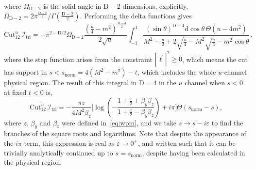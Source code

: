 \documentclass[12pt]{article}
\numberwithin{figure}{section}
\def \be {\begin{equation}}
\def \ee {\end{equation}}
\def \D {\mathrm{D}}
\def \d {\mathrm{d}}
\def \eps {\varepsilon}
\def \geq {\geqslant}
\def \I {\mathcal{I}}
\def \triangle {\mathrm{tri}}
\def \normal {\mathrm{norm}}
\def \Cut {\mathrm{Cut}}
\begin{document}
    where $\Omega_{\D-2}$ is the solid angle in $\D{-}2$ dimensions, explicitly, 
    $\Omega_{\D-2} = 2 \pi^{\frac{\D-2}{2}} /\Gamma \left(\frac{\D-2}{2}\right)$.
    Performing the delta functions gives
    \be
        \Cut_{12}^u\, \I_{\triangle} =
        - \pi^{2-\D/2} \Omega_{\D-2} \frac{\left(\frac{u}{4} - m^2 \right)^{\frac{\D-3}{2}}}{2\sqrt{u}} \int_{-1}^1 \frac{\left(\sin \theta\right)^{\D-4} \d \cos \theta\, \Theta(u-4m^2)}{M^2-\frac{u}{2} + 2 \sqrt{\frac{u}{4}-M^2}\sqrt{\frac{u}{4}-m^2} \cos \theta}\, ,
    \ee
    where the step function arises from the constraint $|\vec{\ell}|^2 \geq 0$, which means the cut has support in $s < s_{\normal} = 4(M^2 - m^2) - t$, which includes the whole $u$-channel physical region.
    The result of this integral in $\D=4$ in the $u$ channel when $s<0$ at fixed $t<0$ is,
    \begin{equation}
        \Cut_{12}^u\, \I_{\triangle} = - \frac{\pi z}{4 M^2 \beta_z} \Big[ \log \left(-\frac{1+\frac{z}{2}+\beta_y \beta_z}{1+\frac{z}{2}-\beta_y \beta_z} \right) + i \pi \Big] \Theta(s_\normal-s) ,
    \end{equation}
    where $z$, $\beta_y$ and $\beta_z$ were defined in~\eqref{eq:wpm}, and we take $s\to s- i \eps$ to find the branches of the square roots and logarithms. Note that despite the appearance of the $i \pi$ term, this expression is real as $\eps\to 0^+$, and written such that it can be trivially analytically continued up to $s=s_\normal$, despite having been calculated in the physical region.
    
\end{document}
